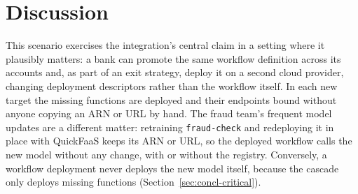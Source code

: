 \section{Discussion}
\label{sec:case-discussion}

This scenario exercises the integration's central claim in a setting where it plausibly matters:
a bank can promote the same workflow definition across its accounts and, as part of an exit
strategy, deploy it on a second cloud provider, changing deployment descriptors rather than the
workflow itself. In each new target the missing functions are deployed and their endpoints bound
without anyone copying an ARN or URL by hand. The fraud team's frequent model updates are a
different matter: retraining \texttt{fraud-check} and redeploying it in place with QuickFaaS keeps
its ARN or URL, so the deployed workflow calls the new model without any change, with or without
the registry. Conversely, a workflow deployment never deploys the new model itself, because the
cascade only deploys missing functions (Section~\ref{sec:concl-critical}).

